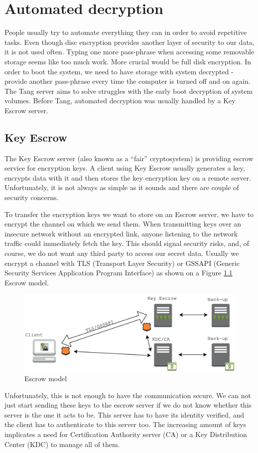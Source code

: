 \chapter{Automated decryption}

People usually try to automate everything they can in order to avoid repetitive tasks.
Even though disc encryption provides another layer of security to our data, it is not used often.
Typing one more pass-phrase when accessing some removable storage seems like too much work.
More crucial would be full disk encryption.
In order to boot the system, we need to have storage with system decrypted - provide another pass-phrase every time the computer is turned off and on again.
The Tang server aims to solve struggles with the early boot decryption of system volumes.
Before Tang, automated decryption was usually handled by a Key Escrow server.

\section{Key Escrow}\label{escrow}

The Key Escrow server (also known as a “fair” cryptosystem) is providing escrow service for encryption keys.
A client using Key Escrow usually generates a key, encrypts data with it and then stores the key encryption key on a remote server.
Unfortunately, it is not always as simple as it sounds and there are couple of security concerns.

To transfer the encryption keys we want to store on an Escrow server, we have to encrypt the channel on which we send them.
When transmitting keys over an insecure network without an encrypted link, anyone listening to the network traffic could immediately fetch the key.
This should signal security risks, and, of course, we do not want any third party to access our secret data.
Usually we encrypt a channel with TLS (Transport Layer Security) or GSSAPI (Generic Security Services Application Program Interface) as shown on a Figure \ref{fig_escrowmodel} Escrow model.
\begin{figure}[h]
    \centering
    \includegraphics[scale=0.7]{figures/EscrowModel.pdf}
    \caption{Escrow model}
    \label{fig_escrowmodel}
\end{figure}
Unfortunately, this is not enough to have the communication secure.
We can not just start sending these keys to the escrow server if we do not know whether this server is the one it acts to be.
This server has to have its identity verified, and the client has to authenticate to this server too.
The increasing amount of keys implicates a need for Certification Authority server (CA) or a Key Distribution Center (KDC) to manage all of them.

